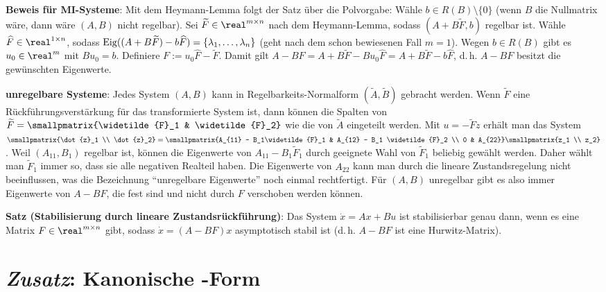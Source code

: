 \linie

\textbf{Beweis für MI-Systeme}:
Mit dem Heymann-Lemma folgt der Satz über die Polvorgabe:
Wähle $b \in R(B) \setminus \{0\}$
(wenn $B$ die Nullmatrix wäre, dann wäre $(A, B)$ nicht regelbar).
Sei $\widetilde{F} \in \real^{m \times n}$ nach dem Heymann-Lemma, sodass
$(A + B\widetilde{F}, b)$ regelbar ist.
Wähle $\widehat{F} \in \real^{1 \times n}$, sodass
$\operatorname{Eig}((A + B\widetilde{F}) - b\widehat{F}) = \{\lambda_1, \dotsc, \lambda_n\}$
(geht nach dem schon bewiesenen Fall $m = 1$).
Wegen $b \in R(B)$ gibt es $u_0 \in \real^m$ mit $Bu_0 = b$.
Definiere $F := u_0 \widehat{F} - \widetilde{F}$.
Damit gilt $A - BF = A + B\widetilde{F} - Bu_0\widehat{F}
= A + B\widetilde{F} - b\widehat{F}$,
d.\,h. $A - BF$ besitzt die gewünschten Eigenwerte.

\linie

\textbf{unregelbare Systeme}:
Jedes System $(A, B)$ kann in Regelbarkeits-Normalform
$(\widetilde{A}, \widetilde{B})$ gebracht werden.
Wenn $\widetilde{F}$ eine Rückführungsverstärkung für das transformierte System ist,
dann können die Spalten von $\widetilde{F} = \smallpmatrix{\widetilde{F}_1 & \widetilde{F}_2}$
wie die von $\widetilde{A}$ eingeteilt werden.
Mit $u = -\widetilde{F}z$ erhält man das System
$\smallpmatrix{\dot{z}_1 \\ \dot{z}_2} = \smallpmatrix{A_{11} - B_1\widetilde{F}_1 &
A_{12} - B_1 \widetilde{F}_2 \\ 0 & A_{22}} \smallpmatrix{z_1 \\ z_2}$.
Weil $(A_{11}, B_1)$ regelbar ist, können die Eigenwerte von $A_{11} - B_1\widetilde{F}_1$
durch geeignete Wahl von $\widetilde{F}_1$ beliebig gewählt werden.
Daher wählt man $\widetilde{F}_1$ immer so, dass sie alle negativen Realteil haben.
Die Eigenwerte von $A_{22}$ kann man durch die lineare Zustandsregelung nicht beeinflussen,
was die Bezeichnung "`unregelbare Eigenwerte"' noch einmal rechtfertigt.
Für $(A, B)$ unregelbar gibt es also immer Eigenwerte von $A - BF$, die fest sind
und nicht durch $F$ verschoben werden können.

\linie

\textbf{Satz (Stabilisierung durch lineare Zustandsrückführung)}:
Das System $\dot{x} = Ax + Bu$ ist stabilisierbar genau dann, wenn
es eine Matrix $F \in \real^{m \times n}$ gibt, sodass $\dot{x} = (A - BF)x$
asymptotisch stabil ist (d.\,h. $A - BF$ ist eine Hurwitz-Matrix).

\section{%
    \emph{Zusatz}: Kanonische -Form%
}

